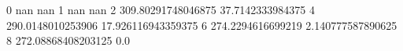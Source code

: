 0 nan nan
1 nan nan
2 309.80291748046875 37.7142333984375
4 290.0148010253906 17.926116943359375
6 274.2294616699219 2.140777587890625
8 272.08868408203125 0.0
